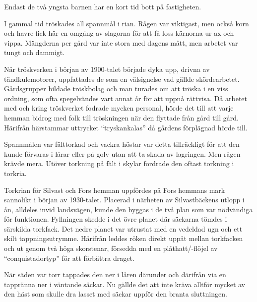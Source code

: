 Endast de två yngsta barnen har en kort tid bott på fastigheten.


%


\jhnooccupant{}


I gammal tid tröskades all spannmål i rian. Rågen var viktigast, men också korn och havre fick här en omgång av slagorna för att få loss kärnorna ur ax och vippa. Mängderna per gård var inte stora med dagens mått, men arbetet var tungt och dammigt.

När tröskverken i början av 1900-talet började dyka upp, drivna av tändkulemotorer, uppfattades de som en välsignelse vad gällde skördearbetet. Gårdsgrupper bildade tröskbolag och man turades om att tröska i en viss ordning, som ofta spegelvändes vart annat år för att uppnå rättvisa. Då arbetet med och kring tröskverket fodrade mycken personal, hörde det till att varje hemman bidrog med folk till tröskningen när den flyttade från gård till gård. Härifrån härstammar uttrycket ``tryskankalas'' då gårdens förplägnad hörde till.

Spannmålen var fälttorkad och vackra höstar var detta tillräckligt för att den kunde förvaras i lårar eller på golv utan att ta skada av lagringen. Men rågen krävde mera. Utöver torkning på fält i skylar fordrade den oftast torkning i torkria.

Torkrian för Silvast och Fors hemman uppfördes på Fors hemmans mark sannolikt i början av 1930-talet. Placerad i närheten av Silvastbäckens utlopp i ån, alldeles invid landsvägen, kunde den byggas i de två plan som var nödvändiga för funktionen. Fyllningen skedde i det övre planet där säckarna tömdes i särskilda torkfack. Det nedre planet var utrustat med en vedeldad ugn och ett skilt tappningsutrymme. Härifrån leddes röken direkt uppåt mellan torkfacken och ut genom två höga skorstenar, försedda med en plåthatt/-flöjel av ``conquistadortyp'' för att förbättra draget.

När säden var torr tappades den ner i låren därunder och därifrån via en tappränna ner i väntande säckar. Nu gällde det att inte kräva alltför mycket av den häst som skulle dra lasset med säckar uppför den branta sluttningen.

